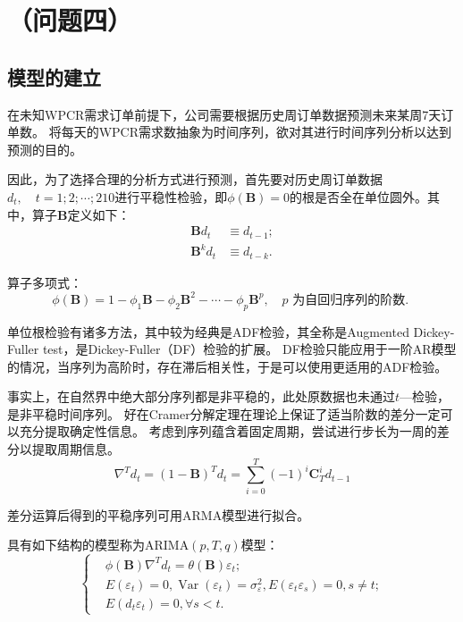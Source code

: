 \section{（问题四）} %
\label{sec:_问题四_}

\subsection{模型的建立} %
\label{sub:模型的建立}

在未知WPCR需求订单前提下，公司需要根据历史周订单数据预测未来某周7天订单数。 将每天的WPCR需求数抽象为时间序列，欲对其进行时间序列分析以达到预测的目的。

因此，为了选择合理的分析方式进行预测，首先要对历史周订单数据${d_t,\quad t=1;2;\cdots;210}$进行平稳性检验，即$\phi(\mathbf{B}) = 0$的根是否全在单位圆外。其中，算子$\mathbf{B}$定义如下：
\begin{equation}
	\begin{aligned}
\boldsymbol{B} d_{t} & \equiv d_{t-1}; \\
\boldsymbol{B}^{k} d_{t} & \equiv d_{t-k}.
\end{aligned}
\end{equation}

算子多项式：
\begin{equation}
	\phi(\boldsymbol{B})=1-\phi_{1} \boldsymbol{B}-\phi_{2} \boldsymbol{B}^{2}-\cdots-\phi_{p} \boldsymbol{B}^{p},\quad  p \text { 为自回归序列的阶数. }
\end{equation}

单位根检验有诸多方法，其中较为经典是ADF检验，其全称是Augmented Dickey-Fuller test，是Dickey-Fuller（DF）检验的扩展。 DF检验只能应用于一阶AR模型的情况，当序列为高阶时，存在滞后相关性，于是可以使用更适用的ADF检验。

事实上，在自然界中绝大部分序列都是非平稳的，此处原数据也未通过$t$—检验，是非平稳时间序列。 好在Cramer分解定理在理论上保证了适当阶数的差分一定可以充分提取确定性信息。 考虑到序列蕴含着固定周期，尝试进行步长为一周的差分以提取周期信息\cite{Python数学实验与建模}。
\begin{equation}
	\nabla^{T} d_{t}=(1-\boldsymbol{B})^{T} d_{t}=\sum_{i=0}^{T}(-1)^{i} \mathbf{C}_{T}^{i} d_{t-1}
\end{equation}

差分运算后得到的平稳序列可用ARMA模型进行拟合。

具有如下结构的模型称为ARIMA$(p, T , q)$模型：
\begin{equation}
	\left\{\begin{array}{cl}
& \phi(\boldsymbol{B}) \nabla^{T} d_{t}=\theta(\boldsymbol{B}) \varepsilon_{t}; \\
&E\left(\varepsilon_{t}\right)=0, \operatorname{Var}\left(\varepsilon_{t}\right)=\sigma_{\varepsilon}^{2}, E\left(\varepsilon_{t} \varepsilon_{s}\right)=0, s \neq t; \\
& E\left(d_{t} \varepsilon_{t}\right)=0, \forall s<t.
\end{array}\right.
\end{equation}


